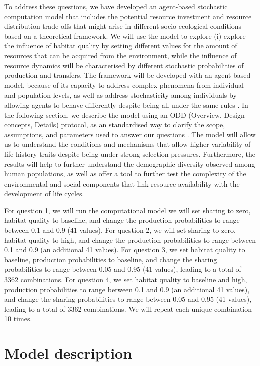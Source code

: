 \documentclass{article}
\begin{document}
To address these questions, we have developed an agent-based stochastic computation model that includes the potential resource investment and resource distribution trade-offs that might arise in different socio-ecological conditions based on a theoretical framework. We will use the model to explore (i)  explore the influence of habitat quality by setting different values for the amount of resources that can be acquired from the environment, while the influence of resource dynamics will be characterised by different stochastic probabilities of production and transfers. The framework will be developed with an agent-based model, because of its capacity to address complex phenomena from individual and population levels, as well as address stochasticity among individuals by allowing agents to behave differently despite being all under the same rules \citep{judson1994rise,wilensky2015introduction}. In the following section, we describe the model using an ODD (Overview, Design concepts, Details) protocol, as an standardised way to clarify the scope, assumptions, and parameters used to answer our questions \citep{grimm2006standard,grimm2020odd}. The model will allow us to understand the conditions and mechanisms that allow higher variability of life history traits despite being under strong selection pressures. Furthermore, the results will help to further understand the demographic diversity observed among human populations, as well as offer a tool to further test the complexity of the environmental and social components that link resource availability with the development of life cycles.

For question 1, we will run the computational model we will set sharing to zero, habitat quality to baseline, and change the production probabilities to range between 0.1 and 0.9 (41 values). For question 2, we will set sharing to zero, habitat quality to high, and change the production probabilities to range between 0.1 and 0.9 (an additional 41 values). For question 3, we set habitat quality to baseline, production probabilities to baseline, and change the sharing probabilities to range between 0.05 and 0.95 (41 values), leading to a total of 3362 combinations. For question 4, we set habitat quality to baseline and high, production probabilities to range between 0.1 and 0.9 (an additional 41 values), and change the sharing probabilities to range between 0.05 and 0.95 (41 values), leading to a total of 3362 combinations. We will repeat each unique combination 10 times.

\section{Model description}
\end{document}

